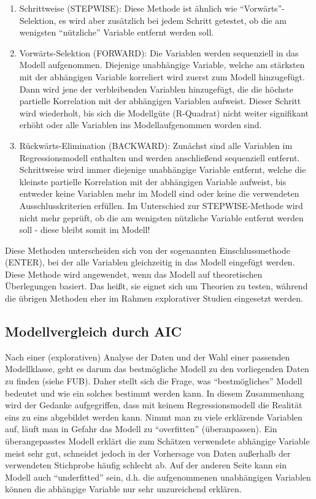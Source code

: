 \documentclass[]{article}
\providecommand{\tightlist}{%
  \setlength{\itemsep}{0pt}\setlength{\parskip}{0pt}}
\begin{document}
\begin{enumerate}
\def\labelenumi{\arabic{enumi}.}
\tightlist
\item
  Schrittweise (STEPWISE): Diese Methode ist ähnlich wie
  ``Vorwärts''-Selektion, es wird aber zusätzlich bei jedem Schritt
  getestet, ob die am wenigsten ``nützliche'' Variable entfernt werden
  soll.
\item
  Vorwärts-Selektion (FORWARD): Die Variablen werden sequenziell in das
  Modell aufgenommen. Diejenige unabhängige Variable, welche am
  stärksten mit der abhängigen Variable korreliert wird zuerst zum
  Modell hinzugefügt. Dann wird jene der verbleibenden Variablen
  hinzugefügt, die die höchste partielle Korrelation mit der abhängigen
  Variablen aufweist. Dieser Schritt wird wiederholt, bis sich die
  Modellgüte (R-Quadrat) nicht weiter signifikant erhöht oder alle
  Variablen ins Modellaufgenommen worden sind.
\item
  Rückwärts-Elimination (BACKWARD): Zunächst sind alle Variablen im
  Regressionsmodell enthalten und werden anschließend sequenziell
  entfernt. Schrittweise wird immer diejenige unabhängige Variable
  entfernt, welche die kleinste partielle Korrelation mit der abhängigen
  Variable aufweist, bis entweder keine Variablen mehr im Modell sind
  oder keine die verwendeten Ausschlusskriterien erfüllen. Im
  Unterschied zur STEPWISE-Methode wird nicht mehr geprüft, ob die am
  wenigsten nützliche Variable entfernt werden soll - diese bleibt somit
  im Modell!
\end{enumerate}

Diese Methoden unterscheiden sich von der sogenannten Einschlussmethode
(ENTER), bei der alle Variablen gleichzeitig in das Modell eingefügt
werden. Diese Methode wird angewendet, wenn das Modell auf theoretischen
Überlegungen basiert. Das heißt, sie eignet sich um Theorien zu testen,
während die übrigen Methoden eher im Rahmen explorativer Studien
eingesetzt werden.

\subsection*{Modellvergleich durch AIC}\label{modellvergleich-durch-aic}

Nach einer (explorativen) Analyse der Daten und der Wahl einer passenden
Modellklasse, geht es darum das bestmögliche Modell zu den vorliegenden
Daten zu finden (siehe FUB). Daher stellt sich die Frage, was
``bestmögliches'' Modell bedeutet und wie ein solches bestimmt werden
kann. In diesem Zusammenhang wird der Gedanke aufgegriffen, dass mit
keinem Regressionsmodell die Realität eins zu eins abgebildet werden
kann. Nimmt man zu viele erklärende Variablen auf, läuft man in Gefahr
das Modell zu ``overfitten'' (überanpassen). Ein überangepasstes Modell
erklärt die zum Schätzen verwendete abhängige Variable meist sehr gut,
schneidet jedoch in der Vorhersage von Daten außerhalb der verwendeten
Stichprobe häufig schlecht ab. Auf der anderen Seite kann ein Modell
auch ``underfitted'' sein, d.h. die aufgenommenen unabhängigen Variablen
können die abhängige Variable nur sehr unzureichend erklären.
\end{document}
